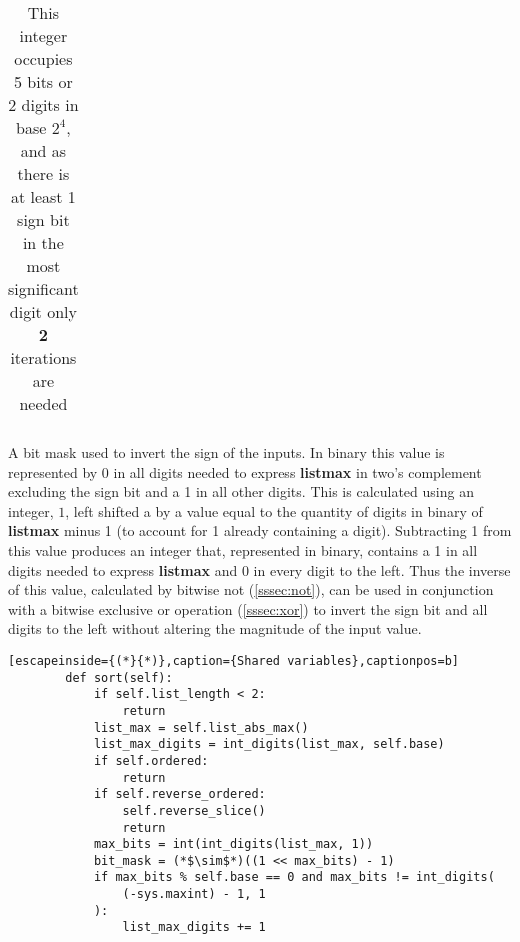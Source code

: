 \documentclass[12pt]{article}
\begin{document}
\begin{description}
\begin{table}[!htb]
\begin{minipage}{.45\textwidth}
\begin{tabular}[t]{cccc}
				\end{tabular}%
				\vspace{0.1cm}
				\caption*{This integer occupies 5 bits or 2 digits in base $2^4$, and as there is at least 1 sign bit in the most significant digit only \textbf{2} iterations are needed}
			\end{minipage}\hfill%
		\end{table}

		\item[bit\textunderscore mask] A bit mask used to invert the sign of the inputs. In binary this value is represented by 0 in all digits needed to express \textbf{list\textunderscore max} in two's complement excluding the sign bit and a 1 in all other digits. This is calculated using an integer, $1$, left shifted a by a value equal to the quantity of digits in binary of \textbf{list\textunderscore max} minus 1 (to account for 1 already containing a digit). Subtracting 1 from this value produces an integer that, represented in binary, contains a 1 in all digits needed to express \textbf{list\textunderscore max} and 0 in every digit to the left. Thus the inverse of this value, calculated by bitwise not (\ref{sssec:not}), can be used in conjunction with a bitwise exclusive or operation (\ref{sssec:xor}) to invert the sign bit and all digits to the left without altering the magnitude of the input value.
	\end{description}
	\begin{table}[H]
		\lstset{
			language=python,
		numbers=left,
		stepnumber=1,
		showstringspaces=false,
		tabsize=3,
		breaklines=true,
		breakatwhitespace=false,
		}
		\centering
		\begin{lstlisting}[escapeinside={(*}{*)},caption={Shared variables},captionpos=b]
		def sort(self):
			if self.list_length < 2:
				return
			list_max = self.list_abs_max()
			list_max_digits = int_digits(list_max, self.base)
			if self.ordered:
				return
			if self.reverse_ordered:
				self.reverse_slice()
				return
			max_bits = int(int_digits(list_max, 1))
			bit_mask = (*$\sim$*)((1 << max_bits) - 1)
			if max_bits % self.base == 0 and max_bits != int_digits(
				(-sys.maxint) - 1, 1
			):
				list_max_digits += 1
		\end{lstlisting}
		\end{table}
		\vspace{-1cm}
\end{document}
